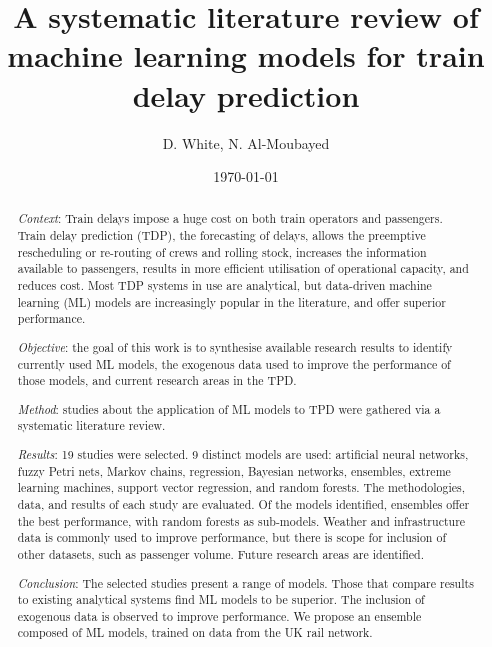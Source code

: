 \documentclass{article}
\title{A systematic literature review of machine learning models for train delay prediction}
\author{D. White, N. Al-Moubayed}
\date{\today}
\begin{document}
\begin{titlingpage}

\maketitle
\begin{abstract}

\textit{Context}: Train delays impose a huge cost on both train operators and passengers. Train delay prediction (TDP), the forecasting of delays, allows the preemptive rescheduling or re-routing of crews and rolling stock, increases the information available to passengers, results in more efficient utilisation of operational capacity, and reduces cost.
Most TDP systems in use are analytical, but data-driven machine learning (ML) models are increasingly popular in the literature, and offer superior performance. 

\smallskip

\textit{Objective}: the goal of this work is to synthesise available research results to identify currently used ML models, the exogenous data used to improve the performance of those models, and current research areas in the TPD. 

\smallskip

\textit{Method}: studies about the application of ML models to TPD were gathered via a systematic literature review. 

\smallskip

\textit{Results}: 19 studies were selected. 9 distinct models are used: artificial neural networks, fuzzy Petri nets, Markov chains, regression, Bayesian networks, ensembles, extreme learning machines, support vector regression, and random forests.
The methodologies, data, and results of each study are evaluated. Of the models identified, ensembles offer the best performance, with random forests as sub-models. Weather and infrastructure data is commonly used to improve performance, but there is scope for inclusion of other datasets, such as passenger volume. 
Future research areas are identified.

\smallskip

\textit{Conclusion}: The selected studies present a range of models. Those that compare results to existing analytical systems find ML models to be superior. The inclusion of exogenous data is observed to improve performance.
We propose an ensemble composed of ML models, trained on data from the UK rail network. 

\end{abstract}
\end{titlingpage}
\end{document}
